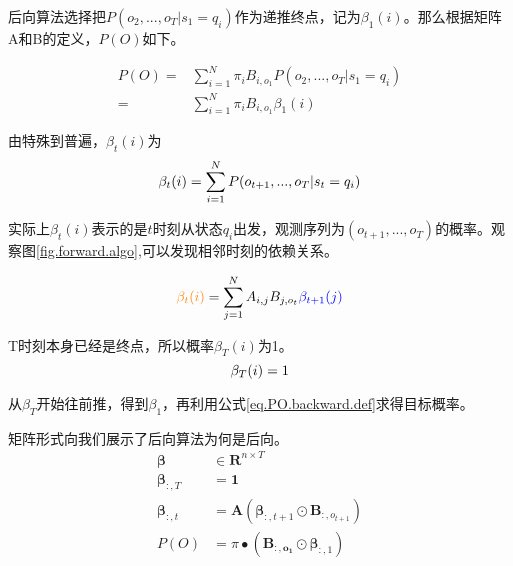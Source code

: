 \documentclass[]{article}
\begin{document}
    后向算法选择把$P(o_{2},...,o_{T}|s_{1}=q_{i})$作为递推终点，记为$\beta_{1}(i)$。那么根据矩阵A和B的定义，$P(O)$如下。
	
	\begin{equation}
		\begin{aligned}
			P(O)
			=&\sum_{i=1}^{N}\pi_{i}B_{i,o_{1}}P(o_{2},...,o_{T}|s_{1}=q_{i}) \\
			=&\sum_{i=1}^{N}\pi_{i}B_{i,o_{1}}\beta_{1}(i) \label{eq.PO.backward.def}
		\end{aligned}
	\end{equation} 
	
 
    由特殊到普遍，$\beta_{t}(i)$为
    \begin{equation}
   		\beta_{t}(i)
   		=\sum_{i=1}^{N}P(o_{t+1},...,o_{T}|s_{t}=q_{i}) \\
    \end{equation} 

    实际上$\beta_{t}(i)$表示的是$t$时刻从状态$q_{i}$出发，观测序列为$(o_{t+1}, ..., o_{T})$的概率。观察图\ref{fig.forward.algo},可以发现相邻时刻的依赖关系。
    
    \begin{equation}
    	\textcolor{orange}{\beta_{t}(i)}
    	=\sum_{j=1}^{N}A_{i,j}B_{j,o_{t}}\textcolor{blue}{\beta_{t+1}(j)} \label{eq.beta.recur}
    \end{equation} 
    
    T时刻本身已经是终点，所以概率$\beta_{T}(i)$为1。
     \begin{equation}
 		\beta_{T}(i)=1 \\
 	\end{equation}    

    从$\beta_{T}$开始往前推，得到$\beta_{1}$，再利用公式\ref{eq.PO.backward.def}求得目标概率。
      
   矩阵形式向我们展示了后向算法为何是后向。
   	\begin{equation}
   		\begin{aligned}
   			\boldsymbol{\beta}&\in \boldsymbol{R}^{n\times T} \\
   			\boldsymbol{\beta}_{:,T}&=\boldsymbol{1} \\
   			\boldsymbol{\beta}_{:,t}&=\boldsymbol{A}(\boldsymbol{\beta}_{:,t+1}\odot  \boldsymbol{B}_{:,o_{t+1}})  \\
   			P(O)&=\pi \bullet (\mathbf{B_{:,o_{1}}} \odot \boldsymbol{\beta}_{:,1})\\
   		\end{aligned}
   	\end{equation}
   
\end{document}
